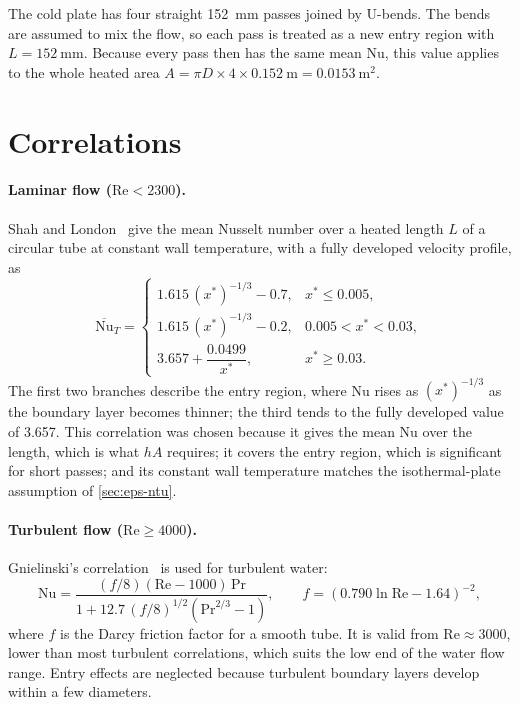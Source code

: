 The cold plate has four straight \SI{152}{\milli\metre} passes joined by
U-bends. The bends are assumed to mix the flow, so each pass is treated as a new
entry region with $L = \SI{152}{\milli\metre}$. Because every pass then has the
same mean Nu, this value applies to the whole heated area
$A = \pi D \times 4 \times \SI{0.152}{\metre} = \SI{0.0153}{\metre\squared}$.

\section{Correlations}

\paragraph{Laminar flow ($\mathrm{Re} < 2300$).} Shah and
London~\cite{shah_laminar_1978} give the mean Nusselt number over a heated
length $L$ of a circular tube at constant wall temperature, with a fully
developed velocity profile, as
\begin{equation}
\overline{\mathrm{Nu}}_T =
\begin{cases}
1.615\,(x^*)^{-1/3} - 0.7,  & x^* \le 0.005, \\[2pt]
1.615\,(x^*)^{-1/3} - 0.2,  & 0.005 < x^* < 0.03, \\[2pt]
3.657 + \dfrac{0.0499}{x^*}, & x^* \ge 0.03.
\end{cases}
\label{eq:app-shah}
\end{equation}
The first two branches describe the entry region, where Nu rises as
$(x^*)^{-1/3}$ as the boundary layer becomes thinner; the third tends to the
fully developed value of 3.657. This correlation was chosen because it gives the
mean Nu over the length, which is what $hA$ requires; it covers the entry
region, which is significant for short passes; and its constant wall
temperature matches the isothermal-plate assumption of \cref{sec:eps-ntu}.

\paragraph{Turbulent flow ($\mathrm{Re} \geq 4000$).} Gnielinski's
correlation~\cite{bergman_fundamentals_2017} is used for turbulent water:
\begin{equation}
  \mathrm{Nu} = \frac{(f/8)(\mathrm{Re} - 1000)\,\mathrm{Pr}}
                     {1 + 12.7\,(f/8)^{1/2}\left(\mathrm{Pr}^{2/3} - 1\right)},
  \qquad
  f = \left(0.790 \ln \mathrm{Re} - 1.64\right)^{-2},
  \label{eq:app-gnielinski}
\end{equation}
where $f$ is the Darcy friction factor for a smooth tube. It is valid from
$\mathrm{Re} \approx 3000$, lower than most turbulent correlations, which suits
the low end of the water flow range. Entry effects are neglected because
turbulent boundary layers develop within a few diameters.

